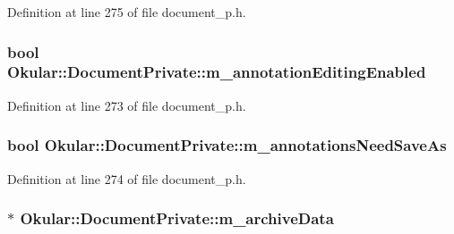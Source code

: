 Definition at line 275 of file document\+\_\+p.\+h.

\hypertarget{classOkular_1_1DocumentPrivate_a700587218254ae03f4ade5fee8ff487c}{
\subsubsection[{m\+\_\+annotation\+Editing\+Enabled}]{\setlength{\rightskip}{0pt plus 5cm}bool Okular\+::\+Document\+Private\+::m\+\_\+annotation\+Editing\+Enabled}}\label{classOkular_1_1DocumentPrivate_a700587218254ae03f4ade5fee8ff487c}


Definition at line 273 of file document\+\_\+p.\+h.

\hypertarget{classOkular_1_1DocumentPrivate_a44f722aa34fee888929abd92fe54ad82}{
\subsubsection[{m\+\_\+annotations\+Need\+Save\+As}]{\setlength{\rightskip}{0pt plus 5cm}bool Okular\+::\+Document\+Private\+::m\+\_\+annotations\+Need\+Save\+As}}\label{classOkular_1_1DocumentPrivate_a44f722aa34fee888929abd92fe54ad82}


Definition at line 274 of file document\+\_\+p.\+h.

\hypertarget{classOkular_1_1DocumentPrivate_a135bb6fa2886b0eb86e9a1b72fd8d25b}{
\subsubsection[{m\+\_\+archive\+Data}]{$\ast$ Okular\+::\+Document\+Private\+::m\+\_\+archive\+Data}}\label{classOkular_1_1DocumentPrivate_a135bb6fa2886b0eb86e9a1b72fd8d25b}


